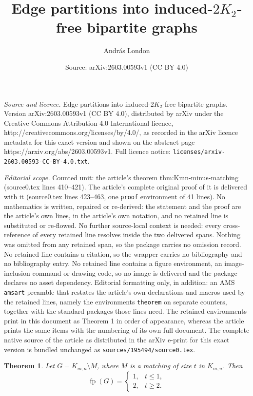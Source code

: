 \documentclass[10pt,a4paper]{amsart}
\title{Edge partitions into induced-$2K_2$-free bipartite graphs}
\author{Andr\'as London}
\date{Source: arXiv:2603.00593v1 (CC BY 4.0)}
\newtheorem{theorem}{Theorem}
\newcommand{\fp}{\operatorname{fp}}
\begin{document}
\maketitle

\noindent\emph{Source and licence.} Edge partitions into induced-$2K_2$-free bipartite graphs. Version arXiv:2603.00593v1 (CC BY 4.0), distributed by arXiv under the Creative Commons Attribution 4.0 International licence, http://creativecommons.org/licenses/by/4.0/, as recorded in the arXiv licence metadata for this exact version and shown on the abstract page https://arxiv.org/abs/2603.00593v1. Full licence notice: \texttt{licenses/arxiv-2603.00593-CC-BY-4.0.txt}.\par\smallskip

\noindent\textit{Editorial scope.} Counted unit: the article's theorem thm:Kmn-minus-matching (source0.tex lines 410--421). The article's complete original proof of it is delivered with it (source0.tex lines 423--463, one \texttt{proof} environment of 41 lines). No mathematics is written, repaired or re-derived: the statement and the proof are the article's own lines, in the article's own notation, and no retained line is substituted or re-flowed.  No further source-local context is needed: every cross-reference of every retained line resolves inside the two delivered spans.  Nothing was omitted from any retained span, so the package carries no omission record.  No retained line contains a citation, so the wrapper carries no bibliography and no bibliography entry.  No retained line contains a figure environment, an image-inclusion command or drawing code, so no image is delivered and the package declares no asset dependency.  Editorial formatting only, in addition: an AMS \texttt{amsart} preamble that restates the article's own declarations and macros used by the retained lines, namely the environments \texttt{theorem} on separate counters, together with the standard packages those lines need.  The retained environments print in this document as Theorem 1 in order of appearance, whereas the article prints the same items with the numbering of its own full document.  The complete native source of the article as distributed in the arXiv e-print for this exact version is bundled unchanged as \texttt{sources/195494/source0.tex}.
\begin{theorem}
\label{thm:Kmn-minus-matching}
Let $G=K_{m,n}\setminus M$, where $M$ is a matching of size $t$ in $K_{m,n}$.
Then
\[
\fp(G)=
\begin{cases}
1, & t\le 1,\\
2, & t\ge 2.
\end{cases}
\]
\end{theorem}
\end{document}

